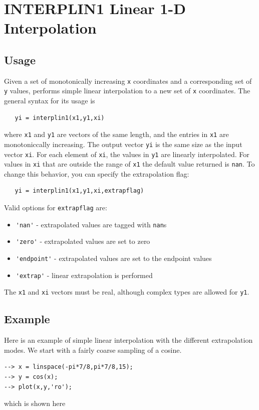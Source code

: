 \section{INTERPLIN1 Linear 1-D Interpolation}

\subsection{Usage}

Given a set of monotonically increasing \verb|x| coordinates and a 
corresponding set of \verb|y| values, performs simple linear 
interpolation to a new set of \verb|x| coordinates. The general syntax
for its usage is
\begin{verbatim}
   yi = interplin1(x1,y1,xi)
\end{verbatim}
where \verb|x1| and \verb|y1| are vectors of the same length, and the entries
in \verb|x1| are monotoniccally increasing.  The output vector \verb|yi| is
the same size as the input vector \verb|xi|.  For each element of \verb|xi|,
the values in \verb|y1| are linearly interpolated.  For values in \verb|xi| 
that are outside the range of \verb|x1| the default value returned is
\verb|nan|.  To change this behavior, you can specify the extrapolation
flag:
\begin{verbatim}
   yi = interplin1(x1,y1,xi,extrapflag)
\end{verbatim}
Valid options for \verb|extrapflag| are:
\begin{itemize}
\item  \verb|'nan'| - extrapolated values are tagged with \verb|nan|s

\item  \verb|'zero'| - extrapolated values are set to zero

\item  \verb|'endpoint'| - extrapolated values are set to the endpoint values 

\item  \verb|'extrap'| - linear extrapolation is performed

\end{itemize}
The \verb|x1| and \verb|xi| vectors must be real, although complex types
are allowed for \verb|y1|.
\subsection{Example}

Here is an example of simple linear interpolation with the different
extrapolation modes.  We start with a fairly coarse sampling of a 
cosine.
\begin{verbatim}
--> x = linspace(-pi*7/8,pi*7/8,15);
--> y = cos(x);
--> plot(x,y,'ro');
\end{verbatim}
which is shown here


